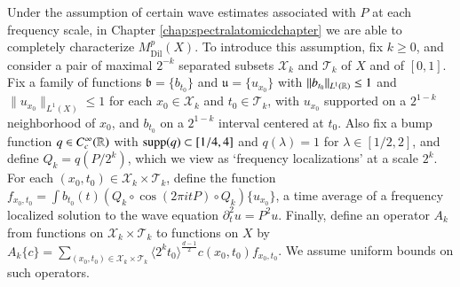 Under the assumption of certain wave estimates associated with $P$ at each frequency scale, in Chapter \ref{chap:spectralatomicdchapter} we are able to completely characterize $M^p_{\text{Dil}}(X)$. To introduce this assumption, fix $k \geq 0$, and consider a pair of maximal $2^{-k}$ separated subsets $\mathcal{X}_k$ and $\mathcal{T}_k$ of $X$ and of $[0,1]$. Fix a family of functions $\mathfrak{b} = \{ b_{t_0} \}$ and $\mathfrak{u} = \{ u_{x_0} \}$ with $\| b_{t_0} \|_{L^1(\operatorname{\mathbb{R}})} \leq 1$ and $\| u_{x_0} \|_{L^1(X)} \leq 1$ for each $x_0 \in \mathcal{X}_k$ and $t_0 \in \mathcal{T}_k$, with $u_{x_0}$ supported on a $2^{1-k}$ neighborhood of $x_0$, and $b_{t_0}$ on a $2^{1-k}$ interval centered at $t_0$. Also fix a bump function $q \in C_c^\infty(\operatorname{\mathbb{R}})$ with $\operatorname{\text{supp}}(q) \subset [1/4,4]$ and $q(\lambda) = 1$ for $\lambda \in [1/2,2]$, and define $Q_k = q(P/2^k)$, which we view as `frequency localizations' at a scale $2^k$. For each $(x_0,t_0) \in \mathcal{X}_k \times \mathcal{T}_k$, define the function $f_{x_0,t_0} = \int b_{t_0}(t) (Q_k \circ \cos(2 \pi i t P) \circ Q_k) \{ u_{x_0} \}$, a time average of a frequency localized solution to the wave equation $\partial_t^2 u = P^2 u$. Finally, define an operator $A_k$ from functions on $\mathcal{X}_k \times \mathcal{T}_k$ to functions on $X$ by $A_k \{ c \} = \sum\nolimits_{(x_0,t_0) \in \mathcal{X}_k \times \mathcal{T}_k} \langle 2^k t_0 \rangle^{\frac{d-1}{2}} c(x_0,t_0) f_{x_0,t_0}$. We assume uniform bounds on such operators.

\vspace{0.5em}

\noindent {}

\vspace{0.4em}

